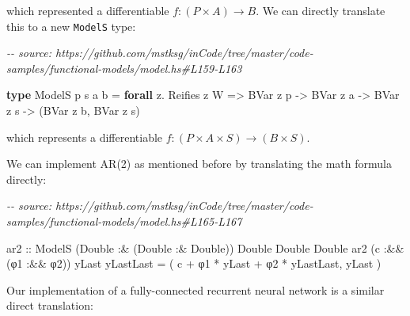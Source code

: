 \documentclass[]{article}
\newenvironment{Shaded}{}{}
\newcommand{\CommentTok}[1]{\textcolor[rgb]{0.38,0.63,0.69}{\textit{#1}}}
\newcommand{\DataTypeTok}[1]{\textcolor[rgb]{0.56,0.13,0.00}{#1}}
\newcommand{\KeywordTok}[1]{\textcolor[rgb]{0.00,0.44,0.13}{\textbf{#1}}}
\newcommand{\NormalTok}[1]{#1}
\newcommand{\OperatorTok}[1]{\textcolor[rgb]{0.40,0.40,0.40}{#1}}
\newcommand{\OtherTok}[1]{\textcolor[rgb]{0.00,0.44,0.13}{#1}}
\begin{document}
which represented a differentiable \(f : (P \times A) \rightarrow B\). We can
directly translate this to a new \texttt{ModelS} type:

\begin{Shaded}
\begin{Highlighting}[]
\CommentTok{{-}{-} source: https://github.com/mstksg/inCode/tree/master/code{-}samples/functional{-}models/model.hs\#L159{-}L163}

\KeywordTok{type} \DataTypeTok{ModelS}\NormalTok{ p s a b }\OtherTok{=} \KeywordTok{forall}\NormalTok{ z}\OperatorTok{.} \DataTypeTok{Reifies}\NormalTok{ z }\DataTypeTok{W}
                   \OtherTok{=\textgreater{}} \DataTypeTok{BVar}\NormalTok{ z p}
                   \OtherTok{{-}\textgreater{}} \DataTypeTok{BVar}\NormalTok{ z a}
                   \OtherTok{{-}\textgreater{}} \DataTypeTok{BVar}\NormalTok{ z s}
                   \OtherTok{{-}\textgreater{}}\NormalTok{ (}\DataTypeTok{BVar}\NormalTok{ z b, }\DataTypeTok{BVar}\NormalTok{ z s)}
\end{Highlighting}
\end{Shaded}

which represents a differentiable \(f : (P \times A \times S) \rightarrow (B
\times S)\).

We can implement AR(2) as mentioned before by translating the math formula
directly:

\begin{Shaded}
\begin{Highlighting}[]
\CommentTok{{-}{-} source: https://github.com/mstksg/inCode/tree/master/code{-}samples/functional{-}models/model.hs\#L165{-}L167}

\OtherTok{ar2 ::} \DataTypeTok{ModelS}\NormalTok{ (}\DataTypeTok{Double} \OperatorTok{:\&}\NormalTok{ (}\DataTypeTok{Double} \OperatorTok{:\&} \DataTypeTok{Double}\NormalTok{)) }\DataTypeTok{Double} \DataTypeTok{Double} \DataTypeTok{Double}
\NormalTok{ar2 (c }\OperatorTok{:\&\&}\NormalTok{ (φ1 }\OperatorTok{:\&\&}\NormalTok{ φ2)) yLast yLastLast }\OtherTok{=}
\NormalTok{    ( c }\OperatorTok{+}\NormalTok{ φ1 }\OperatorTok{*}\NormalTok{ yLast }\OperatorTok{+}\NormalTok{ φ2 }\OperatorTok{*}\NormalTok{ yLastLast, yLast )}
\end{Highlighting}
\end{Shaded}

Our implementation of a fully-connected recurrent neural network is a similar
direct translation:
\end{document}
